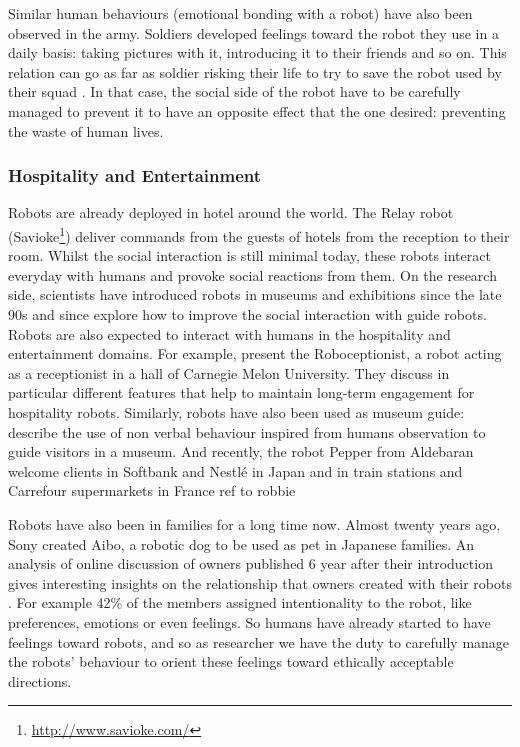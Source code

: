     Similar human behaviours (emotional bonding with a robot) have also been observed in the army. Soldiers developed feelings toward the robot they use in a daily basis: taking pictures with it, introducing it to their friends and so on. This relation can go as far as soldier risking their life to try to save the robot used by their squad \citep{singer2009wired}. In that case, the social side of the robot have to be carefully managed to prevent it to have an opposite effect that the one desired: preventing the waste of human lives.
		
\subsubsection{Hospitality and Entertainment} 
	
	Robots are already deployed in hotel around the world. The Relay robot (Savioke\footnote{\url{http://www.savioke.com/}}) deliver commands from the guests of hotels from the reception to their room. Whilst the social interaction is still minimal today, these robots interact everyday with humans and provoke social reactions from them. On the research side, scientists have introduced robots in museums and exhibitions since the late 90s \citep{thrun1999minerva,burgard1999experiences} and since explore how to improve the social interaction with guide robots.
    Robots are also expected to interact with humans in the hospitality and
    entertainment domains. For example, \citet{gockley2005designing} present the
    Roboceptionist, a robot acting as a receptionist in a hall of Carnegie Melon
    University. They discuss in particular different features that help to
    maintain long-term engagement for hospitality robots. Similarly, robots have
    also been used as museum guide: \citet{karreman2012contextual} describe the
    use of non verbal behaviour inspired from humans observation to guide
    visitors in a museum. And recently, the robot Pepper from Aldebaran
    welcome clients in Softbank and Nestl\'{e} in Japan and in train stations
    and Carrefour supermarkets in France
	ref to robbie
	
    Robots have also been in families for a long time now. Almost twenty years
    ago, Sony created Aibo, a robotic dog to be used as pet in Japanese
    families. An analysis of online discussion of owners published 6 year after
    their introduction gives interesting insights on the relationship that
    owners created with their robots \citep{friedman2003hardware}. For example
    42\% of the members assigned intentionality to the robot, like preferences,
    emotions or even feelings. So humans have already started to have feelings
    toward robots, and so as researcher we have the duty to carefully manage the
    robots' behaviour to orient these feelings toward ethically acceptable
    directions.

